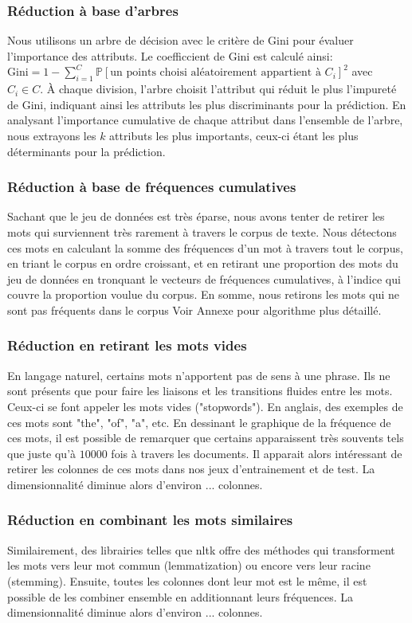 \documentclass{article}
\begin{document}
\subsubsection{Réduction à base d'arbres}
Nous utilisons un arbre de décision avec le critère de Gini pour évaluer l'importance des attributs. Le coefficcient de Gini est calculé ainsi: $\text{Gini} = 1 - \sum_{i=1}^{C} \mathbb{P}[\text{un points choisi aléatoirement appartient à $C_i$}]^2$ avec $C_i \in C$. À chaque division, l’arbre choisit l’attribut qui réduit le plus l'impureté de Gini, indiquant ainsi les attributs les plus discriminants pour la prédiction. En analysant l'importance cumulative de chaque attribut dans l'ensemble de l'arbre, nous extrayons les $k$ attributs les plus importants, ceux-ci étant les plus déterminants pour la prédiction.
\subsubsection{Réduction à base de fréquences cumulatives}
Sachant que le jeu de données est très éparse,  nous avons tenter de retirer les mots qui surviennent très rarement à travers le corpus de texte. Nous détectons ces mots en calculant la somme des fréquences d'un mot à travers tout le corpus, en triant le corpus en ordre croissant, et en retirant une proportion des mots du jeu de données en tronquant le vecteurs de fréquences cumulatives, à l'indice qui couvre la proportion voulue du corpus. En somme, nous retirons les mots qui ne sont pas fréquents dans le corpus Voir Annexe pour algorithme plus détaillé. 
\subsubsection{Réduction en retirant les mots vides}
En langage naturel, certains mots n'apportent pas de sens à une phrase. Ils ne sont présents que pour faire les liaisons et les transitions fluides entre les mots. Ceux-ci se font appeler les mots vides ("stopwords"). En anglais, des exemples de ces mots sont "the", "of", "a", etc. En dessinant le graphique de la fréquence de ces mots, il est possible de remarquer que certains apparaissent très souvents tels que juste qu'à $10 000$ fois à travers les documents. Il apparait alors intéressant de retirer les colonnes de ces mots dans nos jeux d'entrainement et de test. La dimensionnalité diminue alors d'environ ... colonnes.
\subsubsection{Réduction en combinant les mots similaires}
Similairement, des librairies telles que nltk offre des méthodes qui transforment les mots vers leur mot commun (lemmatization) ou encore vers leur racine (stemming). Ensuite, toutes les colonnes dont leur mot est le même, il est possible de les combiner ensemble en additionnant leurs fréquences. La dimensionnalité diminue alors d'environ ... colonnes.
\end{document}
